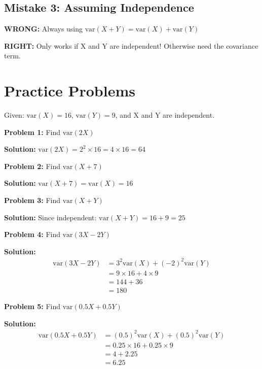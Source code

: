 \documentclass[12pt]{article}
\begin{document}
\subsection*{Mistake 3: Assuming Independence}

\textbf{WRONG:} Always using $\text{var}(X + Y) = \text{var}(X) + \text{var}(Y)$

\textbf{RIGHT:} Only works if X and Y are independent! Otherwise need the covariance term.

\newpage

\section*{\Large Practice Problems}

Given: $\text{var}(X) = 16$, $\text{var}(Y) = 9$, and X and Y are independent.

\vspace{1em}

\textbf{Problem 1:} Find $\text{var}(2X)$

\textbf{Solution:} $\text{var}(2X) = 2^2 \times 16 = 4 \times 16 = 64$

\vspace{2em}

\textbf{Problem 2:} Find $\text{var}(X + 7)$

\textbf{Solution:} $\text{var}(X + 7) = \text{var}(X) = 16$

\vspace{2em}

\textbf{Problem 3:} Find $\text{var}(X + Y)$

\textbf{Solution:} Since independent: $\text{var}(X + Y) = 16 + 9 = 25$

\vspace{2em}

\textbf{Problem 4:} Find $\text{var}(3X - 2Y)$

\textbf{Solution:}
\begin{align*}
\text{var}(3X - 2Y) &= 3^2\text{var}(X) + (-2)^2\text{var}(Y) \\
&= 9 \times 16 + 4 \times 9 \\
&= 144 + 36 \\
&= 180
\end{align*}

\vspace{2em}

\textbf{Problem 5:} Find $\text{var}(0.5X + 0.5Y)$

\textbf{Solution:}
\begin{align*}
\text{var}(0.5X + 0.5Y) &= (0.5)^2\text{var}(X) + (0.5)^2\text{var}(Y) \\
&= 0.25 \times 16 + 0.25 \times 9 \\
&= 4 + 2.25 \\
&= 6.25
\end{align*}
\end{document}
